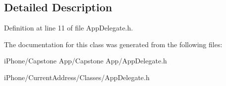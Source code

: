\subsection{Detailed Description}


Definition at line 11 of file App\-Delegate.\-h.



The documentation for this class was generated from the following files\-:\begin{DoxyCompactItemize}
\item 
i\-Phone/\-Capstone App/\-Capstone App/App\-Delegate.\-h\item 
i\-Phone/\-Current\-Address/\-Classes/App\-Delegate.\-h\end{DoxyCompactItemize}
